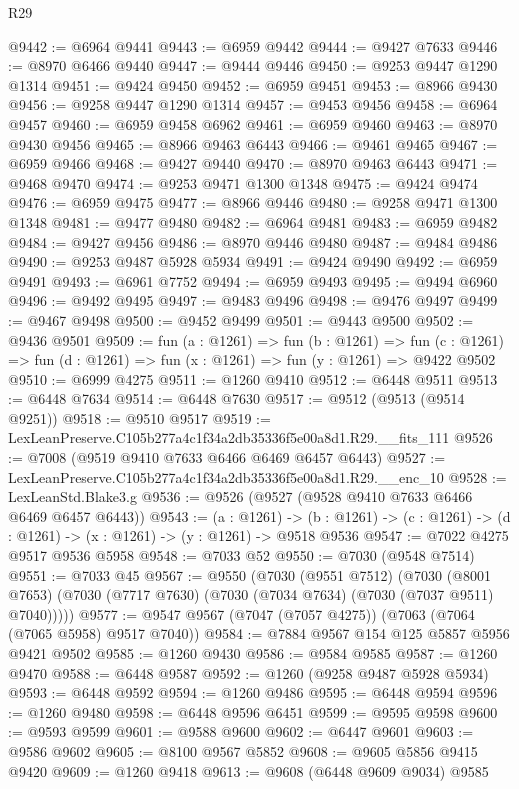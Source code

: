 \begin{lexlean}{R29}
\begin{coremodule}
@9442 := @6964 @9441
@9443 := @6959 @9442
@9444 := @9427 @7633
@9446 := @8970 @6466 @9440
@9447 := @9444 @9446
@9450 := @9253 @9447 @1290 @1314
@9451 := @9424 @9450
@9452 := @6959 @9451
@9453 := @8966 @9430
@9456 := @9258 @9447 @1290 @1314
@9457 := @9453 @9456
@9458 := @6964 @9457
@9460 := @6959 @9458 @6962
@9461 := @6959 @9460
@9463 := @8970 @9430 @9456
@9465 := @8966 @9463 @6443
@9466 := @9461 @9465
@9467 := @6959 @9466
@9468 := @9427 @9440
@9470 := @8970 @9463 @6443
@9471 := @9468 @9470
@9474 := @9253 @9471 @1300 @1348
@9475 := @9424 @9474
@9476 := @6959 @9475
@9477 := @8966 @9446
@9480 := @9258 @9471 @1300 @1348
@9481 := @9477 @9480
@9482 := @6964 @9481
@9483 := @6959 @9482
@9484 := @9427 @9456
@9486 := @8970 @9446 @9480
@9487 := @9484 @9486
@9490 := @9253 @9487 @5928 @5934
@9491 := @9424 @9490
@9492 := @6959 @9491
@9493 := @6961 @7752
@9494 := @6959 @9493
@9495 := @9494 @6960
@9496 := @9492 @9495
@9497 := @9483 @9496
@9498 := @9476 @9497
@9499 := @9467 @9498
@9500 := @9452 @9499
@9501 := @9443 @9500
@9502 := @9436 @9501
@9509 := fun (a : @1261) =>
  fun (b : @1261) =>
  fun (c : @1261) => fun (d : @1261) => fun (x : @1261) => fun (y : @1261) => @9422 @9502
@9510 := @6999 @4275
@9511 := @1260 @9410
@9512 := @6448 @9511
@9513 := @6448 @7634
@9514 := @6448 @7630
@9517 := @9512 (@9513 (@9514 @9251))
@9518 := @9510 @9517
@9519 := LexLeanPreserve.C105b277a4c1f34a2db35336f5e00a8d1.R29.__fits_111
@9526 := @7008 (@9519 @9410 @7633 @6466 @6469 @6457 @6443)
@9527 := LexLeanPreserve.C105b277a4c1f34a2db35336f5e00a8d1.R29.__enc_10
@9528 := LexLeanStd.Blake3.g
@9536 := @9526 (@9527 (@9528 @9410 @7633 @6466 @6469 @6457 @6443))
@9543 := (a : @1261) ->
  (b : @1261) -> (c : @1261) -> (d : @1261) -> (x : @1261) -> (y : @1261) -> @9518 @9536
@9547 := @7022 @4275 @9517 @9536 @5958
@9548 := @7033 @52
@9550 := @7030 (@9548 @7514)
@9551 := @7033 @45
@9567 := @9550
    (@7030
      (@9551 @7512)
      (@7030 (@8001 @7653) (@7030 (@7717 @7630) (@7030 (@7034 @7634) (@7030 (@7037 @9511) @7040)))))
@9577 := @9547 @9567 (@7047 (@7057 @4275)) (@7063 (@7064 (@7065 @5958) @9517 @7040))
@9584 := @7884 @9567 @154 @125 @5857 @5956 @9421 @9502
@9585 := @1260 @9430
@9586 := @9584 @9585
@9587 := @1260 @9470
@9588 := @6448 @9587
@9592 := @1260 (@9258 @9487 @5928 @5934)
@9593 := @6448 @9592
@9594 := @1260 @9486
@9595 := @6448 @9594
@9596 := @1260 @9480
@9598 := @6448 @9596 @6451
@9599 := @9595 @9598
@9600 := @9593 @9599
@9601 := @9588 @9600
@9602 := @6447 @9601
@9603 := @9586 @9602
@9605 := @8100 @9567 @5852
@9608 := @9605 @5856 @9415 @9420
@9609 := @1260 @9418
@9613 := @9608 (@6448 @9609 @9034) @9585

\end{coremodule}
\end{lexlean}
